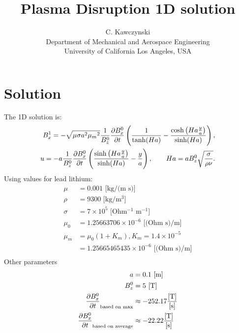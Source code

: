 \documentclass[11pt]{article}
\begin{document}
\doublespacing
\title{Plasma Disruption 1D solution}
\author{C. Kawczynski \\
Department of Mechanical and Aerospace Engineering \\
University of California Los Angeles, USA\\
}
\maketitle

\section{Solution}
The 1D solution is:
\begin{equation}\begin{aligned}
B_x^1 = - \sqrt{\mu \sigma a^2 {\mu_m}^2} \frac{1}{B_z^0} \frac{\partial B_x^0}{\partial t} \left( \frac{1}{\tanh(Ha)} -  \frac{\cosh \left(Ha \frac{y}{a} \right)}{\sinh(Ha)}\right), \\
u   = -a \frac{1}{B_z^0} \frac{\partial B_x^0}{\partial t} \left( \frac{\sinh\left(Ha \frac{y}{a} \right)}{\sinh(Ha)} - \frac{y}{a} \right), \qquad
Ha = a B_z^0 \sqrt{\frac{\sigma}{\rho \nu}}. \\
\end{aligned} \end{equation}
Using values for lead lithium:
\begin{equation}\begin{aligned}
\mu    & = 0.001 \text{ [kg/(m s)]} \\
\rho   & = 9300 \text{ [kg/m$^3$]} \\
\sigma & = 7 \times 10^5 \text{ [Ohm$^{-1}$ m$^{-1}$]} \\
\mu_0  & = 1.25663706    \times 10^{-6} \text{ [(Ohm s)/m]} \\
\mu_m  & = \mu_0 (1+K_m), K_m = 1.4 \times 10^{-5} \\
       & = 1.25665465435 \times 10^{-6} \text{ [(Ohm s)/m]} \\
\end{aligned} \end{equation}
Other parameters
\begin{equation}\begin{aligned}
a                       & = 0.1 \text{ [m]}\\
B_z^0                   & = 5 \text{ [T]}\\
\frac{\partial B_x^0}{\partial t}_{\text{based on max}} & \approx -252.17 \frac{\text{[T]}}{\text{[s]}} \\
\frac{\partial B_x^0}{\partial t}_{\text{based on average}} & \approx -22.22 \frac{\text{[T]}}{\text{[s]}} \\
\end{aligned} \end{equation}
\end{document}

